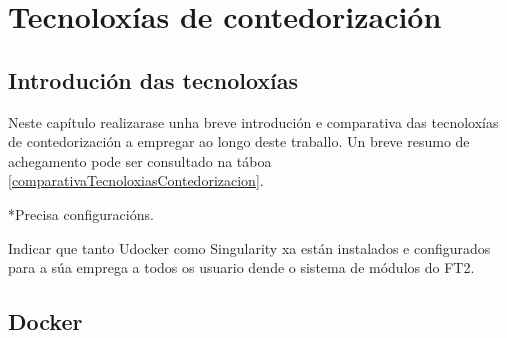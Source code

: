 \chapter{Tecnoloxías de contedorización}
\minitoc
\clearpage

\section{Introdución das tecnoloxías}

Neste capítulo realizarase unha breve introdución e comparativa das tecnoloxías de contedorización a empregar ao longo deste traballo. Un breve resumo de achegamento pode ser consultado na táboa \ref{comparativaTecnoloxiasContedorizacion}.

\begin{table}[H]
\centering
\caption{Comparativa das tecnoloxías de contedorización}
\label{comparativaTecnoloxiasContedorizacion}
*Precisa configuracións.
\end{table}

Indicar que tanto Udocker como Singularity xa están instalados e configurados para a súa emprega a todos os usuario dende o sistema de módulos do \gls{FT2}.

\section{Docker}

